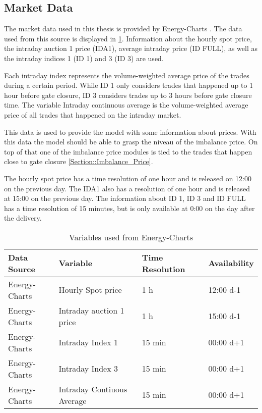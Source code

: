 \documentclass[class=scrbook, crop=false]{standalone}
\begin{document}
\subsection{Market Data}
\label{Section::Market_Data}

The market data used in this thesis is provided by Energy-Charts \cite{EnergyCharts}.
The data used from this source is displayed in \ref{Table::Market_Data}. Information about the hourly spot price, the intraday auction 1 price (IDA1), average intraday price (ID FULL), as well as the intraday indices 1 (ID 1) and 3 (ID 3) are used.

Each intraday index represents the volume-weighted average price of the trades during a certain period. 
While ID 1 only considers trades that happened up to 1 hour before gate closure, ID 3 considers trades up to 3 hours before gate closure time.
The variable Intraday continuous average is the volume-weighted average price of all trades that happened on the intraday market. 

This data is used to provide the model with some information about prices. With this data the model should be able to grasp the niveau of the imbalance price. On top of that one of the imbalance price modules is tied to the trades that happen close to gate closure \ref{Section::Imbalance_Price}.

The hourly spot price has a time resolution of one hour and is released on 12:00 on the previous day. The IDA1 also has a resolution of one hour and is released at 15:00 on the previous day. The information about ID 1, ID 3 and ID FULL has a time resolution of 15 minutes, but is only available at 0:00 on the day after the delivery.
    
\begin{table}[]
\centering
\begin{tabular}{l|l|l|l}
 Data Source & Variable &  Time Resolution & Availability  \\\hline
 Energy-Charts & Hourly Spot price& 1 h& 12:00 d-1 \\
 Energy-Charts & Intraday auction 1 price & 1 h &  15:00 d-1\\
 Energy-Charts & Intraday Index 1 & 15 min &  00:00 d+1\\
 Energy-Charts & Intraday Index 3 & 15 min &  00:00 d+1\\
 Energy-Charts & Intraday Contiuous Average & 15 min &  00:00 d+1\\
   
\end{tabular}
\caption{Variables used from Energy-Charts}
\label{Table::Market_Data}
\end{table}
\end{document}
